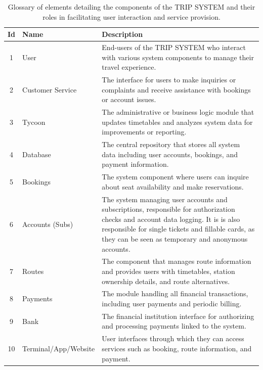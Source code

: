 \begin{table}[H]
    \centering
    \begin{tabular}{@{}clp{9cm}@{}}
    \toprule
    \textbf{Id} & \textbf{Name} & \textbf{Description} \\
    \midrule
    1 & User & End-users of the TRIP SYSTEM who interact with various system components to manage their travel experience. \\
    2 & Customer Service & The interface for users to make inquiries or complaints and receive assistance with bookings or account issues. \\
    3 & Tycoon & The administrative or business logic module that updates timetables and analyzes system data for improvements or reporting. \\
    4 & Database & The central repository that stores all system data including user accounts, bookings, and payment information. \\
    5 & Bookings & The system component where users can inquire about seat availability and make reservations. \\
    6 & Accounts (Subs) & The system managing user accounts and subscriptions, responsible for authorization checks and account data logging. 
    It is is also responsible for single tickets and fillable cards, as they can be seen as temporary and anonymous accounts. \\
    7 & Routes & The component that manages route information and provides users with timetables, station ownership details, and route alternatives. \\
    8 & Payments & The module handling all financial transactions, including user payments and periodic billing. \\
    9 & Bank & The financial institution interface for authorizing and processing payments linked to the system. \\
    10 & Terminal/App/Website & User interfaces through which they can access services such as booking, route information, and payment. \\
    \bottomrule
    \end{tabular}
    \caption{Glossary of elements detailing the components of the TRIP SYSTEM and their roles in facilitating user interaction and service provision.}
    \label{tab:glossary_trip_system}
\end{table}

